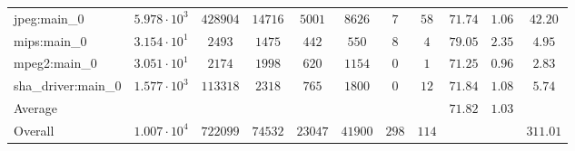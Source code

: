 \begin{tabular}{|l|c|c|c|c|c|c|c|c|c|c|}
jpeg:main\_0            & $ 5.978 \cdot 10^{3} $ & $ 428904 $ & $ 14716 $ & $ 5001  $ & $ 8626  $ & $ 7   $ & $ 58  $ & $ 71.74       $ & $ 1.06    $ & $ 42.20   $ \\
mips:main\_0            & $ 3.154 \cdot 10^{1} $ & $ 2493   $ & $ 1475  $ & $ 442   $ & $ 550   $ & $ 8   $ & $ 4   $ & $ 79.05       $ & $ 2.35    $ & $ 4.95    $ \\
mpeg2:main\_0           & $ 3.051 \cdot 10^{1} $ & $ 2174   $ & $ 1998  $ & $ 620   $ & $ 1154  $ & $ 0   $ & $ 1   $ & $ 71.25       $ & $ 0.96    $ & $ 2.83    $ \\
sha\_driver:main\_0     & $ 1.577 \cdot 10^{3} $ & $ 113318 $ & $ 2318  $ & $ 765   $ & $ 1800  $ & $ 0   $ & $ 12  $ & $ 71.84       $ & $ 1.08    $ & $ 5.74    $ \\
\hline
Average                 & $                    $ & $        $ & $       $ & $       $ & $       $ & $     $ & $     $ & $ 71.82       $ & $ 1.03    $ & $         $ \\
\hline
Overall                 & $ 1.007 \cdot 10^{4} $ & $ 722099 $ & $ 74532 $ & $ 23047 $ & $ 41900 $ & $ 298 $ & $ 114 $ & $             $ & $         $ & $ 311.01  $ \\
\hline
\end{tabular}

